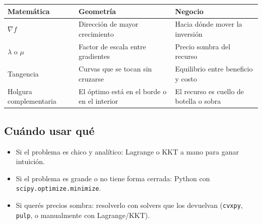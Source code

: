 \documentclass[12pt]{article}
\begin{document}
\begin{center}
\begin{tabular}{@{}p{3cm}p{4.5cm}p{4.5cm}@{}}
\toprule
\textbf{Matemática} & \textbf{Geometría} & \textbf{Negocio} \\
\midrule
$\nabla f$ & Dirección de mayor crecimiento & Hacia dónde mover la inversión \\
$\lambda$ o $\mu$ & Factor de escala entre gradientes & Precio sombra del recurso \\
Tangencia & Curvas que se tocan sin cruzarse & Equilibrio entre beneficio y costo \\
Holgura complementaria & El óptimo está en el borde o en el interior & El recurso es cuello de botella o sobra \\
\bottomrule
\end{tabular}
\end{center}

\subsection{Cuándo usar qué}

\begin{itemize}
    \item Si el problema es chico y analítico: Lagrange o KKT a mano para ganar intuición.
    \item Si el problema es grande o no tiene forma cerrada: Python con \texttt{scipy.optimize.minimize}.
    \item Si querés precios sombra: resolverlo con solvers que los devuelvan (\texttt{cvxpy}, \texttt{pulp}, o manualmente con Lagrange/KKT).
\end{itemize}
\end{document}

